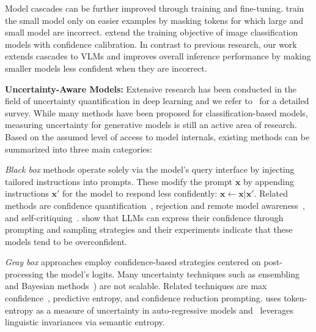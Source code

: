 
Model cascades can be further improved through training and fine-tuning. \citet{wang2024cascadeawaretraininglanguagemodels} train the small model only on easier examples by masking tokens for which large and small model are incorrect. \citet{Enomoro_Eda_2021} extend the training objective of image classification models with confidence calibration. In contrast to previous research, our work extends cascades to VLMs and improves overall inference performance by making smaller models less confident when they are incorrect.

\textbf{Uncertainty-Aware Models:} Extensive research has been conducted in the field of uncertainty quantification in deep learning and we refer to~\citet{abdar2021review} for a detailed survey. While many methods have been proposed for classification-based models, measuring uncertainty for generative models is still an active area of research.
Based on the assumed level of access to model internals, existing methods can be summarized into three main categories:

\emph{Black box} methods operate solely via the model’s query interface by injecting tailored instructions into prompts. These modify the prompt $\mathbf{x}$ by appending instructions $\mathbf{x}'$ for the model to respond less confidently: $\mathbf{x} \leftarrow \mathbf{x} | \mathbf{x}'$. Related methods are confidence quantification~\citep{shrivastava2023llamas}, rejection and remote model awareness~\citep{kadavath2022language}, and self-critiquing~\citep{gou2023critic}. \citet{xiong2024can} show that LLMs can express their confidence through prompting and sampling strategies and their experiments indicate that these models tend to be overconfident.
 
\emph{Gray box} approaches employ confidence-based strategies centered on post-processing the model’s logits. Many uncertainty techniques such as ensembling~\citep{lakshminarayanan2017simple} and Bayesian methods~\citep{blundell2015weight}) are not scalable. Related techniques are  max confidence~\citep{hendrycks2016baseline}, predictive entropy, and confidence reduction prompting. \citet{malinin2021uncertainty} uses token-entropy as a measure of uncertainty in auto-regressive models and~\citet{kuhn2023semantic} leverages linguistic invariances via semantic entropy.
 

